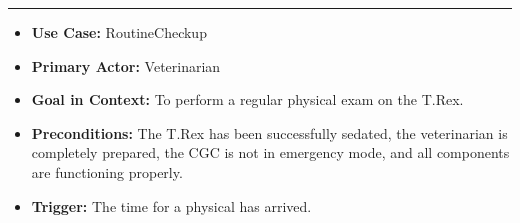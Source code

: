 \documentclass[12pt]{article}
\begin{document}
    \par\noindent\rule{\textwidth}{0.4pt}
    \begin{itemize}
        \item[]\textbf{Use Case:}                                
            RoutineCheckup

        \item[]\textbf{Primary Actor:}
            Veterinarian

        \item[]\textbf{Goal in Context:}
            To perform a regular physical exam on the T.Rex.

        \item[]\textbf{Preconditions:}
            The T.Rex has been successfully sedated, the veterinarian is completely prepared, 
            the CGC is not in emergency mode, and all components are functioning properly.

        \item[]\textbf{Trigger:}
            The time for a physical has arrived.


\end{itemize}
\end{document}
